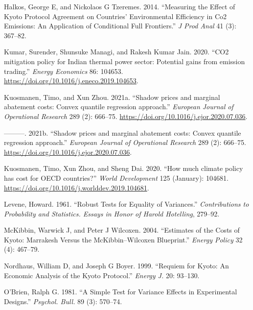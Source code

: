 \documentclass[
  letterpaper,
  DIV=11,
  numbers=noendperiod]{scrartcl}
\newlength{\cslhangindent}
\newlength{\cslentryspacingunit} %
\newenvironment{CSLReferences}[2] %
 {%
  \setlength{\parindent}{0pt}
  \ifodd #1
  \let\oldpar\par
  \def\par{\hangindent=\cslhangindent\oldpar}
  \fi
  \setlength{\parskip}{#2\cslentryspacingunit}
 }%
 {}
\begin{document}
\begin{CSLReferences}{1}{0}
\leavevmode{}%
Halkos, George E, and Nickolaos G Tzeremes. 2014. {``Measuring the
Effect of Kyoto Protocol Agreement on Countries' Environmental
Efficiency in {Co2} Emissions: An Application of Conditional Full
Frontiers.''} \emph{J Prod Anal} 41 (3): 367--82.

\leavevmode{}%
Kumar, Surender, Shunsuke Managi, and Rakesh Kumar Jain. 2020. {``{CO2
mitigation policy for Indian thermal power sector: Potential gains from
emission trading}.''} \emph{Energy Economics} 86: 104653.
\url{https://doi.org/10.1016/j.eneco.2019.104653}.

\leavevmode{}%
Kuosmanen, Timo, and Xun Zhou. 2021a. {``{Shadow prices and marginal
abatement costs: Convex quantile regression approach}.''} \emph{European
Journal of Operational Research} 289 (2): 666--75.
\url{https://doi.org/10.1016/j.ejor.2020.07.036}.

\leavevmode{}%
---------. 2021b. {``{Shadow prices and marginal abatement costs: Convex
quantile regression approach}.''} \emph{European Journal of Operational
Research} 289 (2): 666--75.
\url{https://doi.org/10.1016/j.ejor.2020.07.036}.

\leavevmode{}%
Kuosmanen, Timo, Xun Zhou, and Sheng Dai. 2020. {``{How much climate
policy has cost for OECD countries?}''} \emph{World Development} 125
(January): 104681. \url{https://doi.org/10.1016/j.worlddev.2019.104681}.

\leavevmode{}%
Levene, Howard. 1961. {``Robust Tests for Equality of Variances.''}
\emph{Contributions to Probability and Statistics. Essays in Honor of
Harold Hotelling}, 279--92.

\leavevmode{}%
McKibbin, Warwick J, and Peter J Wilcoxen. 2004. {``Estimates of the
Costs of Kyoto: Marrakesh Versus the {McKibbin--Wilcoxen} Blueprint.''}
\emph{Energy Policy} 32 (4): 467--79.

\leavevmode{}%
Nordhaus, William D, and Joseph G Boyer. 1999. {``Requiem for Kyoto: An
Economic Analysis of the Kyoto Protocol.''} \emph{Energy J.} 20:
93--130.

\leavevmode{}%
O'Brien, Ralph G. 1981. {``A Simple Test for Variance Effects in
Experimental Designs.''} \emph{Psychol. Bull.} 89 (3): 570--74.


\end{CSLReferences}
\end{document}
